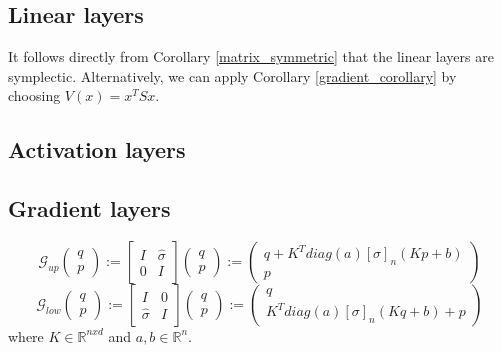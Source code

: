 \documentclass[twoside,a4paper]{article}
\begin{document}

\subsection{Linear layers}

It follows directly from Corollary \ref{matrix_symmetric} that the linear layers are
symplectic. Alternatively, we can apply Corollary \ref{gradient_corollary} by
choosing $V(x) = x^TSx$.


\subsection{Activation layers}

\subsection{Gradient layers}

\begin{equation*}
	\mathcal{G}_{up} \begin{pmatrix}
		q \\
		p
	\end{pmatrix} := \begin{bmatrix}
		I & \hat{\sigma} \\
		0 & I
	\end{bmatrix} \begin{pmatrix}
		q \\
		p
	\end{pmatrix} := \begin{pmatrix}
		q + K^T diag(a) [\sigma]_n(Kp + b) \\
		p
	\end{pmatrix}
\end{equation*}
\begin{equation*}
	\mathcal{G}_{low} \begin{pmatrix}
		q \\
		p
	\end{pmatrix} := \begin{bmatrix}
		I & 0 \\
		\hat{\sigma} & I
	\end{bmatrix} \begin{pmatrix}
		q \\
		p
	\end{pmatrix} := \begin{pmatrix}
		q \\
		K^T diag(a) [\sigma]_n(Kq + b) + p
	\end{pmatrix}
\end{equation*}
where $K \in \mathbb{R}^{nxd}$ and $a,b \in \mathbb{R}^n$.
\end{document}
